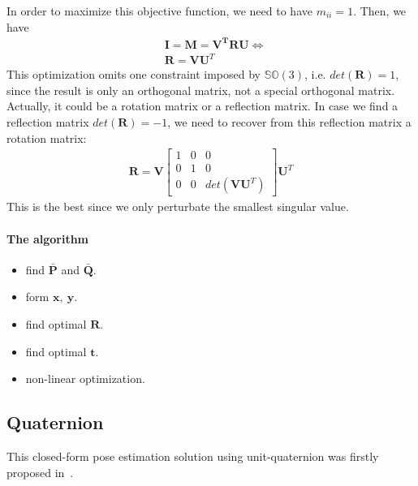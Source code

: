 \documentclass[a4paper]{report}
\begin{document}
In order to maximize this objective function, we need to have $m_{ii}=1$. Then, we have
\begin{align*}
&\mathbf{I}=\mathbf{M}=\mathbf{V^TRU} \Leftrightarrow \\
&\mathbf{R}=\mathbf{VU}^T
\end{align*}
This optimization omits one constraint imposed by $\mathbb{SO}(3)$, i.e. $det(\mathbf{R})=1$, since the result is only an orthogonal matrix, not a special orthogonal matrix. Actually, it could be a rotation matrix or a reflection matrix. In case we find a reflection matrix $det(\mathbf{R})=-1$, we need to recover from this reflection matrix a rotation matrix:
\begin{align*}
\mathbf{R}=\mathbf{V}
\left[
\begin{matrix}
1 & 0 & 0 \\ 0&1&0 \\0&0&det(\mathbf{VU}^T)
\end{matrix}
\right]
\mathbf{U}^T
\end{align*}
This is the best since we only perturbate the smallest singular value.

\paragraph{The algorithm}
\begin{itemize}
	\item find $\bar{\mathbf{P}}$ and $\bar{\mathbf{Q}}$.
	\item form $\mathbf{x},\ \mathbf{y}$.
	\item find optimal $\mathbf{R}$.
	\item find optimal $\mathbf{t}$.
	\item non-linear optimization.
\end{itemize}

\subsection{Quaternion}
This closed-form pose estimation solution using unit-quaternion was firstly proposed in~\cite{horn1987closed}.
\end{document}
